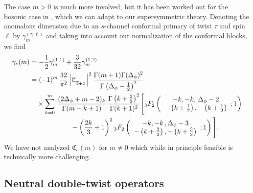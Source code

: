 \documentclass[11pt]{article}
\newcommand{\Phib}{\overline{\Phi}}
\newcommand{\cope}[1]{\mathcal{C}_{_{#1}}}
\begin{document}
The case $m>0$ is much more involved, but it has been worked out for the bosonic case in \cite{Kaviraj:2015xsa}, which we can adapt to our supersymmetric theory. Denoting the anomalous dimension due to an $s$-channel conformal primary of twist $\tau$ and spin $\ell$ by $\gamma_{m}^{(\tau,\ell)}$ and taking into account our normalization of the conformal blocks, we find
%
\begin{equation}
\begin{split}
\gamma_c(m) 
&= 
  -\frac{1}{2}\gamma_{m}^{(1,1)}+\frac{3}{32}\gamma_{m}^{(1,2)} \\
&= 
  (-1)^{m}\, \frac{32}{\pi^{2}}\, 
  \abs{\cope{\Phib\Phi\mathcal{R}}}^2 \, 
    \frac{\Gamma(m+1)\Gamma(\Delta_{\phi})^{2}}{\Gamma\left(\Delta_{\phi}-\frac{1}{2}\right)^{2}}\\
&  \quad \times   
   \sum_{k=0}^{m}\, \frac{(2\Delta_{\phi}+m-2)_{k}}{\Gamma(m-k+1)} \, 
    \frac{\Gamma\left(k+\frac{3}{2}\right)^{2}}{\Gamma(k+1)^{2}} 
  \Bigg[{}_{3}{F}_{2}\left(
    \begin{array}{c}
    {-}k,-k,\,\Delta_{\phi}-2 \\
    -\left(k+\frac{1}{2}\right) ,-\left(k+\frac{1}{2}\right) 
    \end{array}; 1\right)
\\	&\qquad\qquad \qquad
  -\left(\frac{2k}{3}+1\right)^2
  {}_{3}{F}_{2}\left(
    \begin{array}{c}
    -k,-k\,,\Delta_{\phi}-3 \\
    -\left(k+\frac{3}{2}\right) ,- \left(k+\frac{3}{2}\right) 
    \end{array} ; 1\right)\Bigg].
\end{split}
\end{equation}
%
We have not analyzed $\mathfrak{C}_c(m)$ for $m\neq 0$ which while  in principle feasible is technically more challenging.


\subsection{Neutral double-twist operators}
\label{sec:neutraldtwist}
\end{document}
